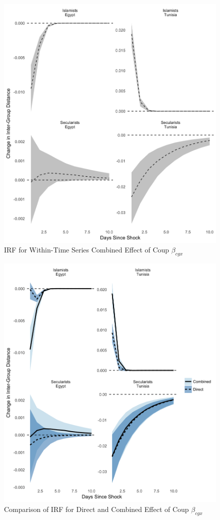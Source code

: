 \documentclass[12pt]{article}
\begin{document}
 \begin{figure}[!h]
	\centering
	\caption{IRF for Within-Time Series Combined Effect of Coup $\beta_{cgx}$}\label{combine_betax}
	\centering
	\includegraphics[width=.9\linewidth]{irf_betax_both}
\end{figure}
 \begin{figure}[!h]
	\centering
	\caption{Comparison of IRF for Direct and Combined Effect of Coup $\beta_{cgx}$}\label{compare_betax}
	\centering
	\includegraphics[width=.9\linewidth]{irf_betax_compare}
\end{figure}
\end{document}

